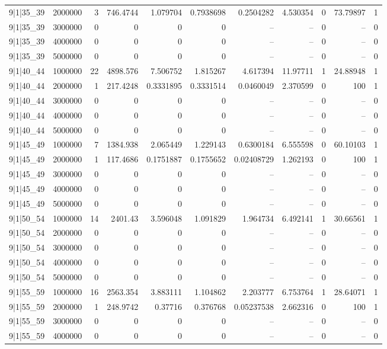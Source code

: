\begin{tabular}{lrrrrrrrrrr}
9|1|35\_39 & 2000000 & 3 & 746.4744 & 1.079704 & 0.7938698 & 0.2504282 & 4.530354 & 0 & 73.79897 & 1 \\
9|1|35\_39 & 3000000 & 0 & 0 & 0 & 0 & -- & -- & 0 & -- & 0 \\
9|1|35\_39 & 4000000 & 0 & 0 & 0 & 0 & -- & -- & 0 & -- & 0 \\
9|1|35\_39 & 5000000 & 0 & 0 & 0 & 0 & -- & -- & 0 & -- & 0 \\
9|1|40\_44 & 1000000 & 22 & 4898.576 & 7.506752 & 1.815267 & 4.617394 & 11.97711 & 1 & 24.88948 & 1 \\
9|1|40\_44 & 2000000 & 1 & 217.4248 & 0.3331895 & 0.3331514 & 0.0460049 & 2.370599 & 0 & 100 & 1 \\
9|1|40\_44 & 3000000 & 0 & 0 & 0 & 0 & -- & -- & 0 & -- & 0 \\
9|1|40\_44 & 4000000 & 0 & 0 & 0 & 0 & -- & -- & 0 & -- & 0 \\
9|1|40\_44 & 5000000 & 0 & 0 & 0 & 0 & -- & -- & 0 & -- & 0 \\
9|1|45\_49 & 1000000 & 7 & 1384.938 & 2.065449 & 1.229143 & 0.6300184 & 6.555598 & 0 & 60.10103 & 1 \\
9|1|45\_49 & 2000000 & 1 & 117.4686 & 0.1751887 & 0.1755652 & 0.02408729 & 1.262193 & 0 & 100 & 1 \\
9|1|45\_49 & 3000000 & 0 & 0 & 0 & 0 & -- & -- & 0 & -- & 0 \\
9|1|45\_49 & 4000000 & 0 & 0 & 0 & 0 & -- & -- & 0 & -- & 0 \\
9|1|45\_49 & 5000000 & 0 & 0 & 0 & 0 & -- & -- & 0 & -- & 0 \\
9|1|50\_54 & 1000000 & 14 & 2401.43 & 3.596048 & 1.091829 & 1.964734 & 6.492141 & 1 & 30.66561 & 1 \\
9|1|50\_54 & 2000000 & 0 & 0 & 0 & 0 & -- & -- & 0 & -- & 0 \\
9|1|50\_54 & 3000000 & 0 & 0 & 0 & 0 & -- & -- & 0 & -- & 0 \\
9|1|50\_54 & 4000000 & 0 & 0 & 0 & 0 & -- & -- & 0 & -- & 0 \\
9|1|50\_54 & 5000000 & 0 & 0 & 0 & 0 & -- & -- & 0 & -- & 0 \\
9|1|55\_59 & 1000000 & 16 & 2563.354 & 3.883111 & 1.104862 & 2.203777 & 6.753764 & 1 & 28.64071 & 1 \\
9|1|55\_59 & 2000000 & 1 & 248.9742 & 0.37716 & 0.376768 & 0.05237538 & 2.662316 & 0 & 100 & 1 \\
9|1|55\_59 & 3000000 & 0 & 0 & 0 & 0 & -- & -- & 0 & -- & 0 \\
9|1|55\_59 & 4000000 & 0 & 0 & 0 & 0 & -- & -- & 0 & -- & 0 \\

\end{tabular}
